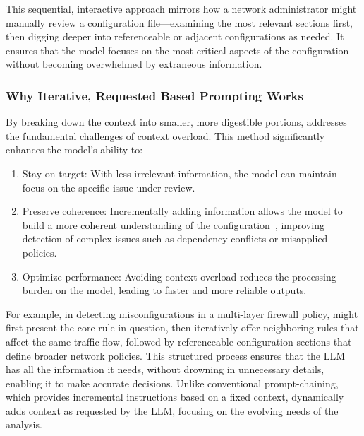 This sequential, interactive approach mirrors how a network administrator might manually review a configuration file—examining the most relevant sections first, then digging deeper into referenceable or adjacent configurations as needed. It ensures that the model focuses on the most critical aspects of the configuration without becoming overwhelmed by extraneous information.

\subsubsection{Why Iterative, Requested Based Prompting Works}
By breaking down the context into smaller, more digestible portions, \sysname{} addresses the fundamental challenges of context overload. This method significantly enhances the model’s ability to:
\begin{enumerate}
    \item Stay on target: With less irrelevant information, the model can maintain focus on the specific issue under review.
    \item Preserve coherence: Incrementally adding information allows the model to build a more coherent understanding of the configuration~\cite{li2023prompt,subramonyam2024bridging}, improving detection of complex issues such as dependency conflicts or misapplied policies.
    \item Optimize performance: Avoiding context overload reduces the processing burden on the model, leading to faster and more reliable outputs.
\end{enumerate}

For example, in detecting misconfigurations in a multi-layer firewall policy, \sysname{} might first present the core rule in question, then iteratively offer neighboring rules that affect the same traffic flow, followed by referenceable configuration sections that define broader network policies. This structured process ensures that the LLM has all the information it needs, without drowning in unnecessary details, enabling it to make accurate decisions. Unlike conventional prompt-chaining, which provides incremental instructions based on a fixed context, \sysname{} dynamically adds context as requested by the LLM, focusing on the evolving needs of the analysis.

